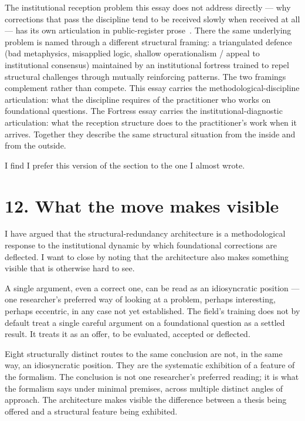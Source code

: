 \documentclass[11pt,a4paper]{article}
\begin{document}
The institutional reception problem this essay does not address directly --- why corrections that pass the discipline tend to be received slowly when received at all --- has its own articulation in public-register prose~\cite{JanzenFortress}. There the same underlying problem is named through a different structural framing: a triangulated defence (bad metaphysics, misapplied logic, shallow operationalism / appeal to institutional consensus) maintained by an institutional fortress trained to repel structural challenges through mutually reinforcing patterns. The two framings complement rather than compete. This essay carries the methodological-discipline articulation: what the discipline requires of the practitioner who works on foundational questions. The Fortress essay carries the institutional-diagnostic articulation: what the reception structure does to the practitioner's work when it arrives. Together they describe the same structural situation from the inside and from the outside.

I find I prefer this version of the section to the one I almost wrote.

\section*{12. What the move makes visible}

I have argued that the structural-redundancy architecture is a methodological response to the institutional dynamic by which foundational corrections are deflected. I want to close by noting that the architecture also makes something visible that is otherwise hard to see.

A single argument, even a correct one, can be read as an idiosyncratic position --- one researcher's preferred way of looking at a problem, perhaps interesting, perhaps eccentric, in any case not yet established. The field's training does not by default treat a single careful argument on a foundational question as a settled result. It treats it as an offer, to be evaluated, accepted or deflected.

Eight structurally distinct routes to the same conclusion are not, in the same way, an idiosyncratic position. They are the systematic exhibition of a feature of the formalism. The conclusion is not one researcher's preferred reading; it is what the formalism says under minimal premises, across multiple distinct angles of approach. The architecture makes visible the difference between a thesis being offered and a structural feature being exhibited.
\end{document}
